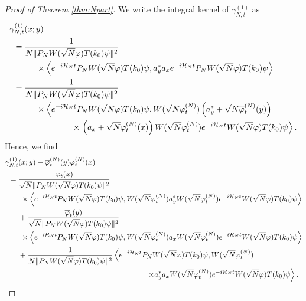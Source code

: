 \documentclass[11pt,a4paper]{article}
\newcommand{\cH}{{\cal H}}
\begin{document}
 \begin{proof}[Proof of Theorem \ref{thm:Npart}]
We write the integral kernel of $\gamma^{(1)}_{N,t}$ as
\[ \begin{split} \gamma^{(1)}_{N,t} &(x;y) \\ = \; &\frac{1}{N \| P_N W(\sqrt{N} \varphi) T(k_0) \psi \|^2} \\ & \hspace{.5cm} \times \left\langle  
e^{-i\cH_N t}  P_N W(\sqrt{N} \varphi) T(k_0) \psi , a_y^* a_x  e^{-i\cH_N t}  P_N W(\sqrt{N} \varphi) T(k_0) \psi \right\rangle \\  = \; & \frac{1}{N \| P_N W(\sqrt{N} \varphi) T(k_0) \psi \|^2} \\ & \hspace{.5cm}  \times \left\langle  
e^{-i\cH_N t}  P_N W(\sqrt{N} \varphi) T(k_0) \psi , W (\sqrt{N} \varphi_t^{(N)}) \left(a_y^* + \sqrt{N} \overline{\varphi}_t^{(N)} (y) \right) \right. \\  & \hspace{2cm} \times \left. \left( a_x + \sqrt{N} \varphi_t^{(N)} (x)\right) W(\sqrt{N} \varphi_t^{(N)})  e^{-i\cH_N t}  W(\sqrt{N} \varphi) T(k_0) \psi \right\rangle. \end{split} \]
Hence, we find
\[ \begin{split} 
 \gamma^{(1)}_{N,t} &(x;y) - \overline{\varphi}_t^{(N)} (y)\varphi_t^{(N)} (x) \\  = \; & \frac{\varphi_t (x)}{\sqrt{N} \| P_N W(\sqrt{N} \varphi) T(k_0) \psi \|^2} 
\\ & \hspace{.1cm}  \times \left\langle  
e^{-i\cH_N t}  P_N W(\sqrt{N} \varphi) T(k_0) \psi , W (\sqrt{N} \varphi_t^{(N)}) a_y^* W(\sqrt{N} \varphi_t^{(N)} ) e^{-i\cH_N t}  W(\sqrt{N} \varphi) T(k_0) \psi \right\rangle \\ &+ \frac{\overline{\varphi}_t (y)}{\sqrt{N} \| P_N W(\sqrt{N} \varphi) T(k_0) \psi \|^2} \\ & \hspace{.1cm}  \times \left\langle  
e^{-i\cH_N t}  P_N W(\sqrt{N} \varphi) T(k_0) \psi , W (\sqrt{N} \varphi_t^{(N)}) a_x W(\sqrt{N} \varphi_t^{(N)} ) e^{-i\cH_N t}  W(\sqrt{N} \varphi) T(k_0) \psi \right\rangle\\ &+ \frac{1}{N \| P_N W(\sqrt{N} \varphi) T(k_0) \psi \|^2} \left\langle  e^{-i\cH_N t}  P_N W(\sqrt{N} \varphi) T(k_0) \psi , W (\sqrt{N} \varphi_t^{(N)}) \right. \\ & \left. \hspace{6cm}  \times  a^*_y a_x W(\sqrt{N} \varphi_t^{(N)})  e^{-i\cH_N t}  W(\sqrt{N} \varphi) T(k_0) \psi \right\rangle. 

\end{split}\]
\end{proof}
\end{document}
